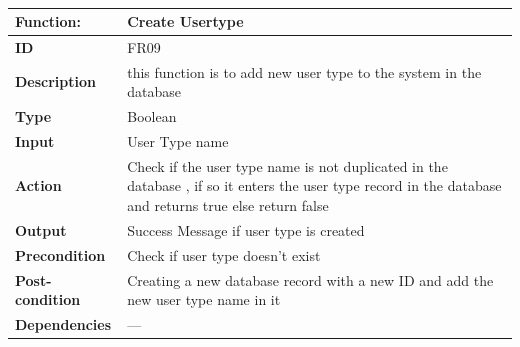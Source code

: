 \documentclass[]{article}
\begin{document}
\FloatBarrier
\begin{table}[h]
\caption{}
\label{tab:my-table}
\begin{tabular}{|p{}|p{}|}
\hline
\textbf{Function:} & Create Usertype
\\ \hline
\textbf{ID}  & FR09           

\\ \hline
\textbf{Description}  & this function is to add new user type to the system in the database                                                                     
\\ \hline
\textbf{Type}   & Boolean     

\\ \hline
\textbf{Input}  & User Type name

\\ \hline
\textbf{Action}  & Check if the user type name is not duplicated in the database , if so it enters the user type record in the database and returns true else return false

\\ \hline
\textbf{Output}  & Success Message if user type is created 

\\ \hline
\textbf{Precondition}  & Check if user type doesn't exist   
\\ \hline
\textbf{Post-condition}  & Creating a new database record with a new ID and add the new user type name in it 
\\ \hline
\textbf{Dependencies} & ---
\\ \hline
\end{tabular}
\end{table}
\FloatBarrier
\end{document}
